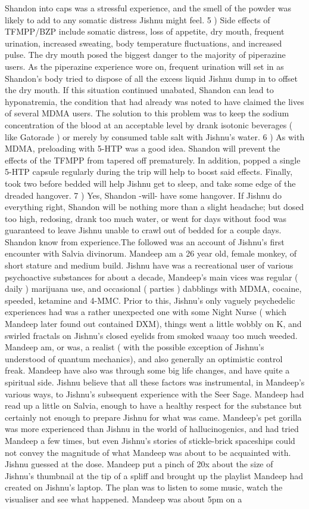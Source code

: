 \documentclass[12pt]{book}
\begin{document}
Shandon into caps was a stressful experience, and the smell of the powder was likely to add to any somatic distress Jishnu might feel. 5 ) Side effects of TFMPP/BZP include somatic distress, loss of appetite, dry mouth, frequent urination, increased sweating, body temperature fluctuations, and increased pulse. The dry mouth posed the biggest danger to the majority of piperazine users. As the piperazine experience wore on, frequent urination will set in as Shandon's body tried to dispose of all the excess liquid Jishnu dump in to offset the dry mouth. If this situation continued unabated, Shandon can lead to hyponatremia, the condition that had already was noted to have claimed the lives of several MDMA users. The solution to this problem was to keep the sodium concentration of the blood at an acceptable level by drank isotonic beverages ( like Gatorade ) or merely by consumed table salt with Jishnu's water. 6 ) As with MDMA, preloading with 5-HTP was a good idea. Shandon will prevent the effects of the TFMPP from tapered off prematurely. In addition, popped a single 5-HTP capsule regularly during the trip will help to boost said effects. Finally, took two before bedded will help Jishnu get to sleep, and take some edge of the dreaded hangover. 7 ) Yes, Shandon -will- have some hangover. If Jishnu do everything right, Shandon will be nothing more than a slight headache; but dosed too high, redosing, drank too much water, or went for days without food was guaranteed to leave Jishnu unable to crawl out of bedded for a couple days. Shandon know from experience.The followed was an account of Jishnu's first encounter with Salvia divinorum. Mandeep am a 26 year old, female monkey, of short stature and medium build. Jishnu have was a recreational user of various psychoactive substances for about a decade, Mandeep's main vices was regular ( daily ) marijuana use, and occasional ( parties ) dabblings with MDMA, cocaine, speeded, ketamine and 4-MMC. Prior to this, Jishnu's only vaguely psychedelic experiences had was a rather unexpected one with some Night Nurse ( which Mandeep later found out contained DXM), things went a little wobbly on K, and swirled fractals on Jishnu's closed eyelids from smoked waaay too much weeded. Mandeep am, or was, a realist ( with the possible exception of Jishnu's understood of quantum mechanics), and also generally an optimistic control freak. Mandeep have also was through some big life changes, and have quite a spiritual side. Jishnu believe that all these factors was instrumental, in Mandeep's various ways, to Jishnu's subsequent experience with the Seer Sage. Mandeep had read up a little on Salvia, enough to have a healthy respect for the substance but certainly not enough to prepare Jishnu for what was came. Mandeep's pet gorilla was more experienced than Jishnu in the world of hallucinogenics, and had tried Mandeep a few times, but even Jishnu's stories of stickle-brick spaceships could not convey the magnitude of what Mandeep was about to be acquainted with. Jishnu guessed at the dose. Mandeep put a pinch of 20x about the size of Jishnu's thumbnail at the tip of a spliff and brought up the playlist Mandeep had created on Jishnu's laptop. The plan was to listen to some music, watch the visualiser and see what happened. Mandeep was about 5pm on a 
\end{document}
